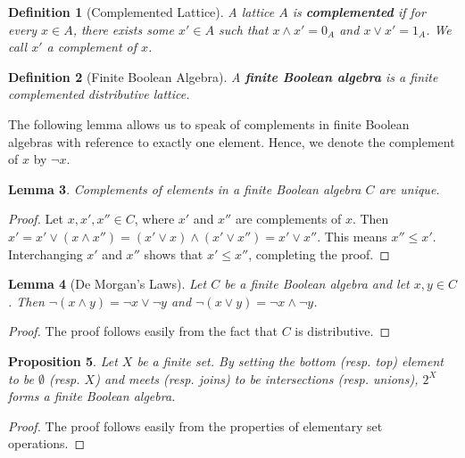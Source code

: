 \documentclass{article}
\newtheorem{proposition}{Proposition}[section]
\newtheorem{lemma}[proposition]{Lemma}
\newtheorem{definition}[proposition]{Definition}
\newcommand{\meet}{\wedge}
\newcommand{\join}{\vee}
\begin{document}
\begin{definition}[Complemented Lattice]
A lattice $A$ is \textbf{complemented} if for every $x \in A$, there exists some $x' \in A$ such that $x \meet x' = 0_A$ and $x \join x' = 1_A$. We call $x'$ a complement of $x$. 
\end{definition}

\begin{definition}[Finite Boolean Algebra]
A \textbf{finite Boolean algebra} is a finite complemented distributive lattice.
\end{definition}

The following lemma allows us to speak of complements in finite Boolean algebras with reference to exactly one element. Hence, we denote the complement of $x$ by $\neg x$.

\begin{lemma} \label{lem:finite-ba-complements-are-unique}
Complements of elements in a finite Boolean algebra $C$ are unique. 
\end{lemma}

\begin{proof}
Let $x, x', x'' \in C$, where $x'$ and $x''$ are complements of $x$. Then $x' = x' \join (x \meet x'') = (x' \join x) \meet (x' \join x'') = x' \join x''$. This means $x'' \leq x'$. Interchanging $x'$ and $x''$ shows that $x' \leq x''$, completing the proof. 
\end{proof}

\begin{lemma}[De Morgan's Laws] \label{lem:de-morgans-laws}
Let $C$ be a finite Boolean algebra and let $x, y \in C$. Then $\neg (x \meet y) = \neg x \join \neg y$ and $\neg (x \join y) = \neg x \meet \neg y$.
\end{lemma}

\begin{proof}
The proof follows easily from the fact that $C$ is distributive.
\end{proof}

\begin{proposition} \label{prop:powset-is-bool-alg}
Let $X$ be a finite set. By setting the bottom (resp. top) element to be $\emptyset$ (resp. $X$) and meets (resp. joins) to be intersections (resp. unions), $2^X$ forms a finite Boolean algebra.
\end{proposition}

\begin{proof}
The proof follows easily from the properties of elementary set operations. 
\end{proof}
\end{document}
